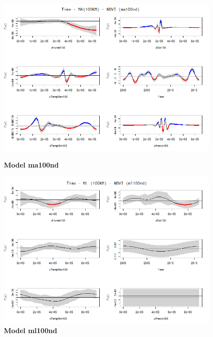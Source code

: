 \begin{figure}[H]
    \begin{minipage}{0.8\textwidth}
        \centering
        \includegraphics[width=1.2\textwidth]{ma100nd.png} %
        \caption{\textbf{Model ma100nd}}
    \end{minipage}\hfill
    \begin{minipage}{0.8\textwidth}
        \centering
        \includegraphics[width=1.2\textwidth]{ml100nd.png} %
        \caption{\textbf{Model ml100nd}}
    \end{minipage}
\end{figure}


